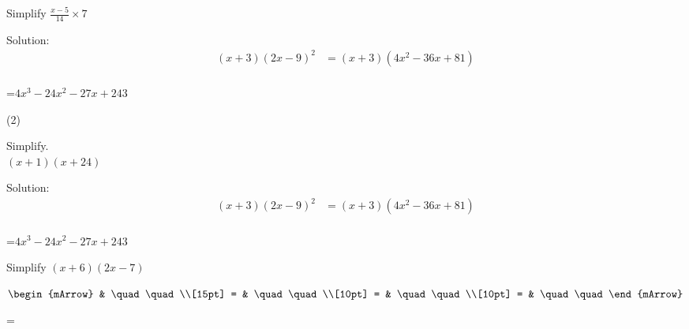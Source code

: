 \begin{mtask}[resume]
   \task \begin{exercise} Simplify $\frac{x-5}{14}\times 7$
              \begin{envSolution}
			      Solution:
			      \begin{align*}
			        (x+3)(2x-9)^2  &= (x+3)(4x^2-36x+81)                      \\[10pt]    
				 \end{align*}
                 \begin{shortsolution}  
				       =$4x^3-24x^2-27x+243$
			     \end{shortsolution}				 
               \end{envSolution}
         \end{exercise}

\end{mtask}

\clearpage



\begin{mtask}[resume](2)
   \task \begin{exercise} Simplify.\\
                          \-\hspace{1cm} $ (x+1)(x+24)$
              \begin{envSolution}
			      Solution:
			      \begin{align*}
			        (x+3)(2x-9)^2  &= (x+3)(4x^2-36x+81)                      \\[10pt]    
				 \end{align*}
                 \begin{shortsolution}  
				       =$4x^3-24x^2-27x+243$
			     \end{shortsolution}				 
               \end{envSolution}
         \end{exercise}

   \task \begin{exercise} Simplify $(x+6)(2x-7)$
           \begin{envSolution}
             $\begin{mArrow} 
			       & \quad \quad              \\[15pt]
                 = & \quad \quad              \\[10pt]
		   		 = & \quad \quad              \\[10pt]
				 = & \quad \quad 
              \end{mArrow}$
            \begin{shortsolution}  
			     =$ \quad \quad \quad \quad$
			\end{shortsolution}				 
           \end{envSolution}
         \end{exercise}
\end{mtask}

